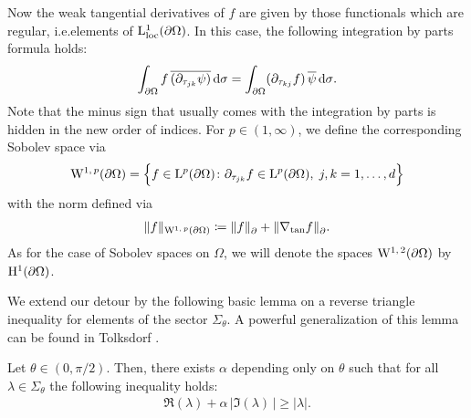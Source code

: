 Now the weak tangential derivatives of $f$ are given by those functionals which are regular, i.e.\@ elements of $\mathrm{L}^1_{\mathrm{loc}}(\partial\Omega)$.
In this case, the following integration by parts formula holds:
\begin{align}
    \label{eq:intByPartsTang}
    \int_{\partial\Omega} f\, \overline{( \partial_{\tau_{jk}} \psi)} \, {\operatorname{d}\!{\sigma}} = \int_{\partial\Omega} (\partial_{\tau_{kj}} f)\, \overline{\psi} \, {\operatorname{d}\!{\sigma}}.
\end{align}
Note that the minus sign that usually comes with the integration by parts is hidden in the new order of indices.
For $p \in (1,\infty)$, we define the corresponding Sobolev space via
\begin{align*}
  \mathrm{W}^{1,\,p}(\partial\Omega) = \Big\{ f \in \mathrm{L}^p(\partial\Omega) \colon \partial_{\tau_{jk}} f \in \mathrm{L}^p(\partial\Omega), \; j,k = 1,\dots,d \Big\}
\end{align*}
with the norm defined via
\begin{align*}
  \| f \|_{\mathrm{W}^{1,\,p}(\partial\Omega)} \coloneqq \|f\|_\partial^{} + \|\nabla_{\mathrm{tan} } f \|_\partial^{}.
\end{align*}
As for the case of Sobolev spaces on $\Omega$, we will denote the spaces $\mathrm{W}^{1,\,2}(\partial\Omega)$ by $\mathrm{H}^1(\partial\Omega)$.

We extend our detour by the following basic lemma on a reverse triangle inequality for elements of the sector $\Sigma_\theta$.
A powerful generalization of this lemma can be found in Tolksdorf \cite[Lem.\@~5.2.4]{tolksdorf}.

\begin{lem}
  \label{lem:lambdaIneq}
  Let $\theta \in (0,\pi/2)$.
  Then, there exists $\alpha$ depending only on $\theta$ such that for all $\lambda \in \Sigma_\theta$ the following inequality holds:
  \begin{align*}
    \Re(\lambda) + \alpha \, \big|\Im(\lambda)\,\big| \geq |\lambda|.
  \end{align*}
\end{lem}

